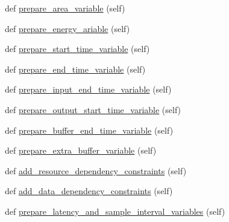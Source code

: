 \begin{DoxyCompactItemize}
\item 
def \hyperlink{classsylva_1_1dse_1_1dse__engine_1_1_d_s_e_engine_ace681eee5a37993f9cf735bcd023e9de}{prepare\+\_\+area\+\_\+variable} (self)
\item 
def \hyperlink{classsylva_1_1dse_1_1dse__engine_1_1_d_s_e_engine_a2dc4f8208c8a82370cda417fccc72a9c}{prepare\+\_\+energy\+\_\+ariable} (self)
\item 
def \hyperlink{classsylva_1_1dse_1_1dse__engine_1_1_d_s_e_engine_ae3e382b3415f1afc675282c1040e2dac}{prepare\+\_\+start\+\_\+time\+\_\+variable} (self)
\item 
def \hyperlink{classsylva_1_1dse_1_1dse__engine_1_1_d_s_e_engine_a1c6ea77716fae6e7b5c979c6ec21c0dc}{prepare\+\_\+end\+\_\+time\+\_\+variable} (self)
\item 
def \hyperlink{classsylva_1_1dse_1_1dse__engine_1_1_d_s_e_engine_a4209c92c3a0c9f0c24f8c52e0bf937af}{prepare\+\_\+input\+\_\+end\+\_\+time\+\_\+variable} (self)
\item 
def \hyperlink{classsylva_1_1dse_1_1dse__engine_1_1_d_s_e_engine_aa92a6f059b3e74dfe5a2e92eca5ee803}{prepare\+\_\+output\+\_\+start\+\_\+time\+\_\+variable} (self)
\item 
def \hyperlink{classsylva_1_1dse_1_1dse__engine_1_1_d_s_e_engine_ac6a6c26525cd5cd62041fb5f6aa26635}{prepare\+\_\+buffer\+\_\+end\+\_\+time\+\_\+variable} (self)
\item 
def \hyperlink{classsylva_1_1dse_1_1dse__engine_1_1_d_s_e_engine_ab24aae396cd670d90d55b6a6fee75a08}{prepare\+\_\+extra\+\_\+buffer\+\_\+variable} (self)
\item 
def \hyperlink{classsylva_1_1dse_1_1dse__engine_1_1_d_s_e_engine_a32018f5a2ead55e21e2e980d6ef86440}{add\+\_\+resource\+\_\+dependency\+\_\+constraints} (self)
\item 
def \hyperlink{classsylva_1_1dse_1_1dse__engine_1_1_d_s_e_engine_a5d2b68f2c64c9edbc86ec584912261fd}{add\+\_\+data\+\_\+dependency\+\_\+constraints} (self)
\item 
def \hyperlink{classsylva_1_1dse_1_1dse__engine_1_1_d_s_e_engine_afda19a625b733636e59c1dec52478357}{prepare\+\_\+latency\+\_\+and\+\_\+sample\+\_\+interval\+\_\+variables} (self)
\end{DoxyCompactItemize}
